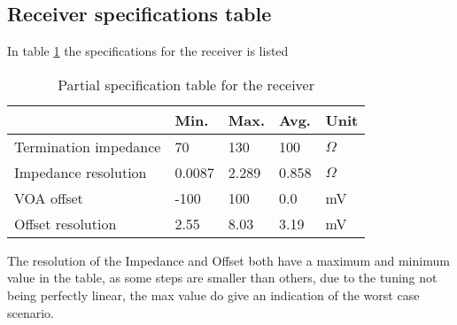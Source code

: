 \subsection{Receiver specifications table }

In table \ref{tab:specifications} the specifications for the receiver is listed


\begin{table}[H]
  \centering
  \begin{tabular}{l|l|l|l|l}
    & Min. & Max. & Avg. & Unit \\
    \hline
	Termination impedance & 70 & 130 & 100 & $\Omega$\\
	Impedance resolution & 0.0087 & 2.289 & 0.858 & $\Omega$\\
	VOA offset & -100 & 100 & 0.0 & mV\\
	Offset resolution & 2.55 & 8.03 & 3.19 & mV\\
  \end{tabular}
  \caption{Partial specification table for the receiver}
  \label{tab:specifications}
\end{table}

The resolution of the Impedance and Offset both have a maximum and minimum value in the table, as some steps are smaller than others, due to the tuning not being perfectly linear, the max value do give an indication of the worst case scenario.


